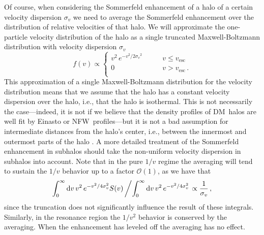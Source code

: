 \documentclass[aps,prd,twocolumn,amsmath,amssymb,floatfix,nofootinbib,10pt]{revtex4}
\newcommand{\ie}{i.e.}
\newcommand{\NFW}{NFW}
\newcommand{\DM}{DM}
\newcommand{\somm}{\ensuremath{S}}
\newcommand{\dd}{\mathrm{d}}
\newcommand{\order}{\ensuremath{\mathcal{O}}}
\newcommand{\sigv}{\ensuremath{\sigma_v}}
\begin{document}
Of course, when considering the Sommerfeld enhancement of a halo of a
certain velocity dispersion $\sigv$ we need to average the Sommerfeld
enhancement over the distribution of relative velocities of that
halo. We will approximate the one-particle velocity distribution of
the halo as a single truncated Maxwell-Boltzmann distribution with
velocity dispersion $\sigv$
\begin{equation}\label{eq:maxboltz}
f(v) \propto \left\{
\begin{array}{rl}
v^2\, e^{-v^2/2\sigv^2}  & \qquad v \leq v_{\mathrm{esc}}\\
0 & \qquad v > v_{\mathrm{esc}}\, .\\
\end{array} \right.
\end{equation}
This approximation of a single Maxwell-Boltzmann
distribution for the velocity distribution means that we assume that
the halo has a constant velocity dispersion over the halo, \ie, that
the halo is isothermal. This is not necessarily the case---indeed, it
is not if we believe that the density profiles of \DM\ halos are well
fit by Einasto or \NFW\ profiles---but it is not a bad assumption for
intermediate distances from the halo's center, \ie, between the
innermost and outermost parts of the halo
\cite{2007ApJ...667L..53W}. A more detailed treatment of the
Sommerfeld enhancement in subhalos should take the non-uniform
velocity dispersion in subhalos into account. Note that in the pure
$1/v$ regime the averaging will tend to sustain the $1/v$ behavior up
to a factor $\order(1)$, as we have that
\begin{equation}
\int_0^\infty \dd v \, v^2\, e^{-v^2/4\sigv^2}
\somm(v)\left/\int_0^\infty \dd v \, v^2\, e^{-v^2/4\sigv^2} \right.\propto
\frac{1}{\sigv}\, ,
\end{equation}
since the truncation does not significantly influence the result of
these integrals. Similarly, in the resonance region the $1/v^2$
behavior is conserved by the averaging. When the enhancement has
leveled off the averaging has no effect.
\end{document}

